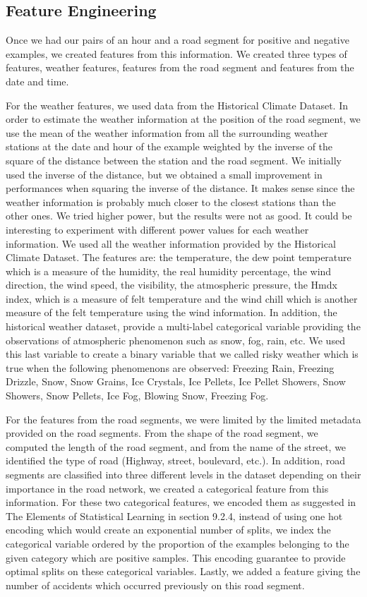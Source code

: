 \documentclass[conference]{IEEEtran}
\begin{document}
\subsection{Feature Engineering}
Once we had our pairs of an hour and a road segment for positive and negative examples, we created features from this information. We created three types of features, weather features, features from the road segment and features from the date and time.

For the weather features, we used data from the Historical Climate Dataset. In order to estimate the weather information at the position of the road segment, we use the mean of the weather information from all the surrounding weather stations at the date and hour of the example weighted by the inverse of the square of the distance between the station and the road segment. We initially used the inverse of the distance, but we obtained a small improvement in performances when squaring the inverse of the distance. It makes sense since the weather information is probably much closer to the closest stations than the other ones. We tried higher power, but the results were not as good. It could be interesting to experiment with different power values for each weather information. We used all the weather information provided by the Historical Climate Dataset. The features are: the temperature, the dew point temperature which is a measure of the humidity, the real humidity percentage, the wind direction, the wind speed, the visibility, the atmospheric pressure, the Hmdx index, which is a measure of felt temperature and the wind chill which is another measure of the felt temperature using the wind information. In addition, the historical weather dataset, provide a multi-label categorical variable providing the observations of atmospheric phenomenon such as snow, fog, rain, etc. We used this last variable to create a binary variable that we called risky weather which is true when the following phenomenons are observed: Freezing Rain, Freezing Drizzle, Snow, Snow Grains, Ice Crystals, Ice Pellets, Ice Pellet Showers, Snow Showers, Snow Pellets, Ice Fog, Blowing Snow, Freezing Fog.

For the features from the road segments, we were limited by the limited metadata provided on the road segments. From the shape of the road segment, we computed the length of the road segment, and from the name of the street, we identified the type of road (Highway, street, boulevard, etc.). In addition, road segments are classified into three different levels in the dataset depending on their importance in the road network, we created a categorical feature from this information. For these two categorical features, we encoded them as suggested in The Elements of Statistical Learning\cite{elementsofstat} in section 9.2.4, instead of using one hot encoding which would create an exponential number of splits, we index the categorical variable ordered by the proportion of the examples belonging to the given category which are positive samples. This encoding guarantee to provide optimal splits on these categorical variables. Lastly, we added a feature giving the number of accidents which occurred previously on this road segment.
\end{document}

